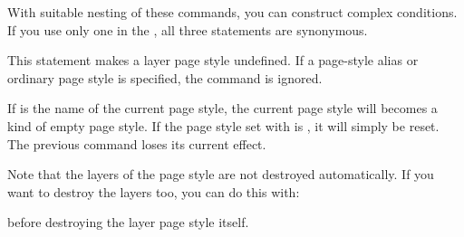 With suitable nesting of these commands, you can construct complex conditions.
If you use only one  in the , all three
statements are synonymous.%
\EndIndexGroup


\begin{Declaration}
\end{Declaration}
%
%
\iftrue
This statement makes a layer page style undefined. If a page-style alias or
ordinary page style is specified, the command is ignored.
\else
With this command you can remove a the definition of a layer page style.
However, this only occurs if a layer page style named \PName{page style name}
exists. If, instead, it is a page-style alias, a different (non-layer) page
style, or not a page style at all, nothing happens; the command is ignored.%
\fi

If  is the name of the current page style, the current
page style will becomes a kind of empty page style. If the page style set with
 is , it will simply
be reset. The previous  command loses its
current effect.

Note that the layers of the page style are not destroyed
automatically. If you want to destroy the layers too, you can do this with: 
\begin{lstcode}
\end{lstcode}
before destroying the layer page style itself.%
\iffalse %
\par
The command is intended to be used within the \PName{code} argument of
\DescRef{\LabelBase.cmd.scrlayerOnAutoRemoveInterface} to remove page styles
that are defined as part of an end-user interface. See
\autoref{sec:scrlayer.enduserinterfaces} below for more information about
auto-removal code.%
\fi%
\EndIndexGroup
\EndIndexGroup



